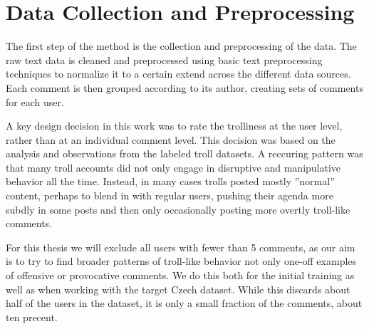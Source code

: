 \documentclass[twoside]{ctuthesis}
\theoremstyle{plain}
\theoremstyle{definition}
\theoremstyle{note}
\begin{document}
\section{Data Collection and Preprocessing}
The first step of the method is the collection and preprocessing of the data. The raw text data is cleaned and preprocessed using basic text preprocessing techniques to normalize it to a certain extend across the different data sources. Each comment is then grouped according to its author, creating sets of comments for each user.\par
A key design decision in this work was to rate the trolliness at the user level, rather than at an individual comment level. This decision was based on the analysis and observations from the labeled troll datasets. A reccuring pattern was that many troll accounts did not only engage in disruptive and manipulative behavior all the time. Instead, in many cases trolls posted mostly ''normal'' content, perhaps to blend in with regular users, pushing their agenda more subdly in some posts and then only occasionally posting more overtly troll-like comments.\par
For this thesis we will exclude all users with fewer than 5 comments, as our aim is to try to find broader patterns of troll-like behavior not only one-off examples of offensive or provocative comments. We do this both for the initial training as well as when working with the target Czech dataset. While this discards about half of the users in the dataset, it is only a small fraction of the comments, about ten precent.\par
\end{document}
